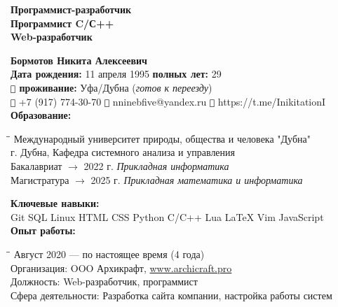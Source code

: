 \documentclass[14pt]{extreport}
\begin{document}
\parindent=0pt
\begin{center} 
    {\Huge\textbf{Программист-разработчик \\ Программист C/С++ \\ Web-разработчик \\}}
\end{center}

{\colorbox{color00}{\Large\textbf{Бормотов Никита Алексеевич}\hspace{251pt}}}\vspace{7pt} \\
\textbf{Дата рождения:} 11 апреля 1995 \hfill
\textbf{полных лет:} 29 \\
\textbf{\texttt{}\hspace{6pt} проживание:} Уфа/Дубна (\textit{готов к переезду}) \\ 

\texttt{} +7 (917) 774-30-70 \hfill
\texttt{} nninebfive@yandex.ru \hfill
\texttt{} https://t.me/InikitationI \\

\textbf{Образование:}
\vspace{-10pt}
\begin{tabbing}
    \hspace{100pt}\=\hspace{80pt}\=\kill
    Международный университет природы, общества и человека "Дубна" \\
    г. Дубна, Кафедра системного анализа и управления \\
    Бакалавриат  \> $\to$ 2022 г. \> \textit{Прикладная информатика} \\
    Магистратура \> $\to$ 2025 г. \> \textit{Прикладная математика и информатика} \\
\end{tabbing}
\vspace{-10pt}

\textbf{\large Ключевые навыки:} \\
\colorbox{color00}{Git}
\colorbox{color00}{SQL}
\colorbox{color00}{Linux}
\colorbox{color00}{HTML}
\colorbox{color00}{CSS}
\colorbox{color00}{Python}
\colorbox{color00}{C/C++}
\colorbox{color00}{Lua}
\colorbox{color00}{\LaTeX}
\colorbox{color00}{Vim}
\colorbox{color00}{JavaScript} \\

\textbf{Опыт работы:}
\vspace{-10pt}
\begin{tabbing}
    \hspace{180pt}\=\hspace{80pt}\=\kill
    Август 2020 --- по настоящее время (4 года) \\
    Организация:        \> OOO Архикрафт, \href{www.archicraft.pro}{www.archicraft.pro} \\
    Должность:          \> Web-разработчик, программист \\
    Сфера деятельности: \> Разработка сайта компании, настройка работы систем \\
\end{tabbing}
\vspace{-10pt}
\end{document}
